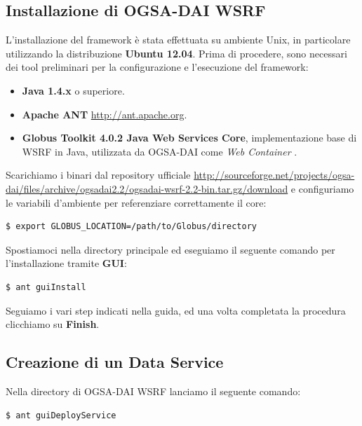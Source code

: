 \documentclass[11pt]{article}
\begin{document}
\subsection{Installazione di OGSA-DAI WSRF}

L'installazione del framework è stata effettuata su ambiente Unix, in particolare utilizzando la distribuzione \textbf{Ubuntu 12.04}. Prima di procedere, sono necessari dei tool preliminari per la configurazione e l'esecuzione del framework: 
\begin{itemize}
	\item \textbf{Java 1.4.x} o superiore.
	\item \textbf{Apache ANT} \url{http://ant.apache.org}.
	\item \textbf{Globus Toolkit 4.0.2 Java Web Services Core}, implementazione base di WSRF in Java, utilizzata da OGSA-DAI come \emph{Web Container} \cite{ogsadai}.
\end{itemize}

Scarichiamo i binari dal repository ufficiale \url{http://sourceforge.net/projects/ogsa-dai/files/archive/ogsadai2.2/ogsadai-wsrf-2.2-bin.tar.gz/download} e configuriamo le variabili d'ambiente per referenziare correttamente il core: 


\begin{lstlisting}[language=bash]
$ export GLOBUS_LOCATION=/path/to/Globus/directory
\end{lstlisting}
Spostiamoci nella directory principale ed eseguiamo il seguente comando per l'installazione tramite \textbf{GUI}: 
\begin{lstlisting}[language=bash]
$ ant guiInstall
\end{lstlisting}

Seguiamo i vari step indicati nella guida, ed una volta completata la procedura clicchiamo su \textbf{Finish}.

\subsection{Creazione di un Data Service}

Nella directory di OGSA-DAI WSRF lanciamo il seguente comando: 

\begin{lstlisting}[language=bash]
$ ant guiDeployService
\end{lstlisting}
\end{document}
